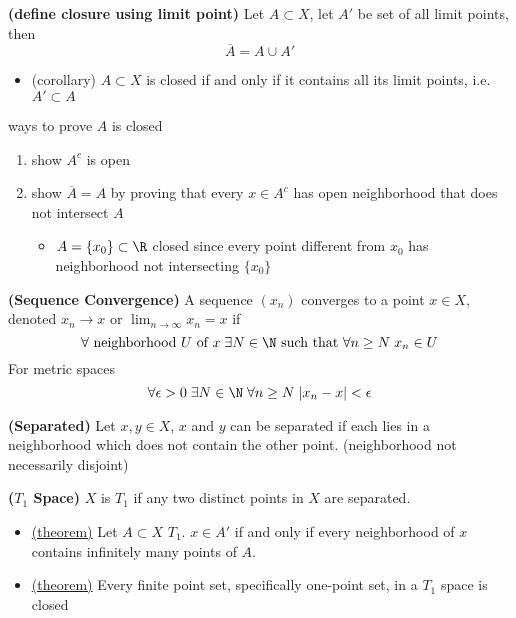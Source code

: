 \documentclass[10.5pt]{article}
\begin{document}
\begin{theorem*}
    \textbf{(define closure using limit point)} Let $A\subset X$, let $A'$ be set of all limit points, then
    \[
        \overline{A} = A\cup A'    
    \]
    \begin{itemize}
        \item (corollary) $A\subset X$ is closed if and only if it contains all its limit points, i.e. $A' \subset A$
    \end{itemize}
\end{theorem*}

\begin{rem}
    ways to prove $A$ is closed 
    \begin{enumerate}
        \item show $A^c$ is open
        \item show $\overline{A} = A$ by proving that every $x\in A^c$ has open neighborhood that does not intersect $A$
        \begin{itemize}
            \item $A=\{x_0\} \subset \R$ closed since every point different from $x_0$ has neighborhood not intersecting $\{x_0\}$
        \end{itemize}
    \end{enumerate}
\end{rem}

\begin{defn*}
    \textbf{(Sequence Convergence)} A sequence $(x_n)$ converges to a point $x\in X$, denoted $x_n \to x$ or $\lim_{n\to \infty} x_n = x$ if 
    \[
        \forall \text{ neighborhood } U \text{ of } x\; \exists N\in \N \text{ such that } \forall n\geq N \; x_n \in U
    \]
    For metric spaces
    \[
        \forall \epsilon > 0 \; \exists N\in \N \; \forall n\geq N \; |x_n - x| < \epsilon
    \]
\end{defn*}

\begin{defn*}
    \textbf{(Separated)} Let $x,y\in X$, $x$ and $y$ can be separated if each lies in a neighborhood which does not contain the other point. (neighborhood not necessarily disjoint)
\end{defn*}

\begin{defn*}
    \textbf{($T_1$ Space)} $X$ is $T_1$ if any two distinct points in $X$ are separated.
    \begin{itemize}
        \item \underline{(theorem)} Let $A\subset X$ $T_1$. $x\in A'$ if and only if every neighborhood of $x$ contains infinitely many points of $A$.
        \item \underline{(theorem)} Every finite point set, specifically one-point set, in a $T_1$ space is closed
    \end{itemize}
\end{defn*}
\end{document}
